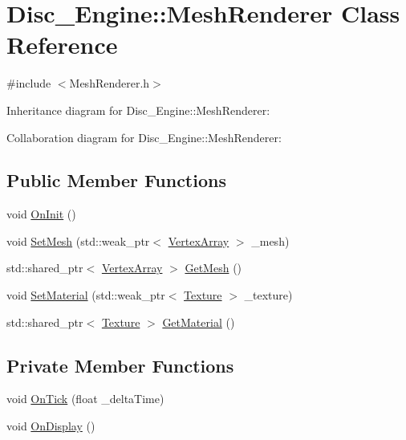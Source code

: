 \hypertarget{class_disc___engine_1_1_mesh_renderer}{}\section{Disc\+\_\+\+Engine\+:\+:Mesh\+Renderer Class Reference}
\label{class_disc___engine_1_1_mesh_renderer}


{\ttfamily \#include $<$Mesh\+Renderer.\+h$>$}



Inheritance diagram for Disc\+\_\+\+Engine\+:\+:Mesh\+Renderer\+:


Collaboration diagram for Disc\+\_\+\+Engine\+:\+:Mesh\+Renderer\+:
\subsection*{Public Member Functions}
\begin{DoxyCompactItemize}
\item 
void \mbox{\hyperlink{class_disc___engine_1_1_mesh_renderer_ac16873520f636cdf1f0afdc0c25ab6ae}{On\+Init}} ()
\item 
void \mbox{\hyperlink{class_disc___engine_1_1_mesh_renderer_ab40ea6de71fb6f9ef7e40348ea13de5b}{Set\+Mesh}} (std\+::weak\+\_\+ptr$<$ \mbox{\hyperlink{class_disc___engine_1_1_vertex_array}{Vertex\+Array}} $>$ \+\_\+mesh)
\item 
std\+::shared\+\_\+ptr$<$ \mbox{\hyperlink{class_disc___engine_1_1_vertex_array}{Vertex\+Array}} $>$ \mbox{\hyperlink{class_disc___engine_1_1_mesh_renderer_aaaee7c1ea7305219fd442e11006f9440}{Get\+Mesh}} ()
\item 
void \mbox{\hyperlink{class_disc___engine_1_1_mesh_renderer_ab6080999b90175c224b4590fabba3da2}{Set\+Material}} (std\+::weak\+\_\+ptr$<$ \mbox{\hyperlink{class_disc___engine_1_1_texture}{Texture}} $>$ \+\_\+texture)
\item 
std\+::shared\+\_\+ptr$<$ \mbox{\hyperlink{class_disc___engine_1_1_texture}{Texture}} $>$ \mbox{\hyperlink{class_disc___engine_1_1_mesh_renderer_a7600b0f777f1d63cb3e0302ba637878e}{Get\+Material}} ()
\end{DoxyCompactItemize}
\subsection*{Private Member Functions}
\begin{DoxyCompactItemize}
\item 
void \mbox{\hyperlink{class_disc___engine_1_1_mesh_renderer_aa5290108f670218f471ba7553b912c06}{On\+Tick}} (float \+\_\+delta\+Time)
\item 
void \mbox{\hyperlink{class_disc___engine_1_1_mesh_renderer_a9c3bbe43b1a26d9cbc2e3b3a93c2e7cc}{On\+Display}} ()
\end{DoxyCompactItemize}
